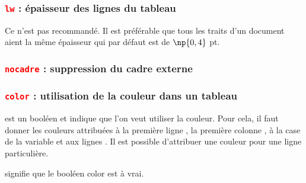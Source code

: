 \begin{tkzexample}[width=9cm,small]
\end{tkzexample}

\subsubsection{\texttt{\textcolor{red}{lw}} : épaisseur des lignes du tableau}
Ce n'est pas recommandé. Il est préférable que tous les traits d'un document aient la même épaisseur qui par défaut est de $\np{0,4}$ pt.

\begin{tkzexample}[width=8cm,small]
\end{tkzexample}

\subsubsection{\texttt{\textcolor{red}{nocadre}} : suppression du cadre externe}

\begin{tkzexample}[width=8cm,small]
\end{tkzexample}

\subsubsection{\texttt{\textcolor{red}{color}} : utilisation de la couleur dans un tableau}
 est un booléen et indique que l'on veut utiliser la couleur. Pour cela, il faut donner les couleurs attribuées à la première ligne , la première colonne , à la case de la variable  et aux lignes . Il est possible d'attribuer une couleur  pour une ligne particulière.

 signifie que le booléen color est à vrai.


